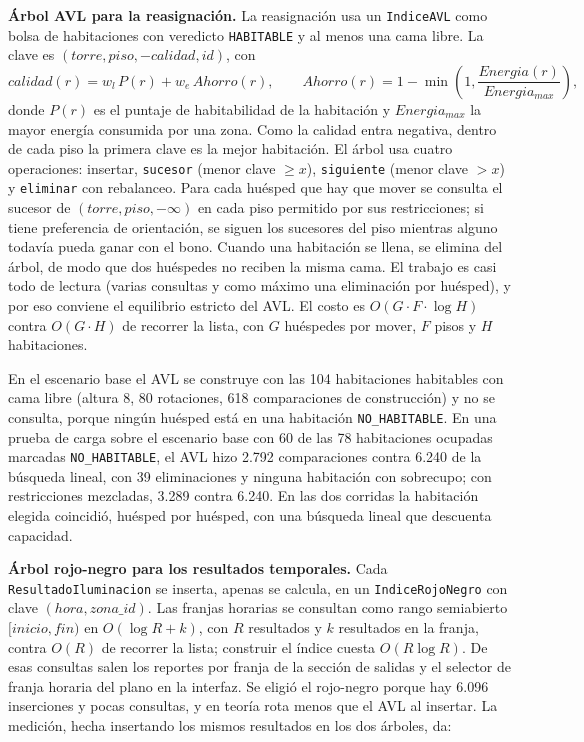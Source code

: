 \documentclass[12pt,a4paper]{article}
\newcommand{\clase}[1]{\texttt{#1}}
\newcommand{\estado}[1]{\texttt{#1}}
\newcommand{\codigo}[1]{\texttt{#1}}
\begin{document}
\textbf{Árbol AVL para la reasignación.} La reasignación usa un \clase{IndiceAVL} como bolsa de habitaciones con veredicto \estado{HABITABLE} y al menos una cama libre. La clave es $(torre, piso, -calidad, id)$, con
\begin{equation}
 calidad(r)=w_l\,P(r)+w_e\,Ahorro(r),\qquad Ahorro(r)=1-\min\left(1,\frac{Energia(r)}{Energia_{max}}\right),
 \label{eq:calidad}
\end{equation}
donde $P(r)$ es el puntaje de habitabilidad de la habitación y $Energia_{max}$ la mayor energía consumida por una zona. Como la calidad entra negativa, dentro de cada piso la primera clave es la mejor habitación. El árbol usa cuatro operaciones: insertar, \codigo{sucesor} (menor clave $\geq x$), \codigo{siguiente} (menor clave $>x$) y \codigo{eliminar} con rebalanceo. Para cada huésped que hay que mover se consulta el sucesor de $(torre, piso, -\infty)$ en cada piso permitido por sus restricciones; si tiene preferencia de orientación, se siguen los sucesores del piso mientras alguno todavía pueda ganar con el bono. Cuando una habitación se llena, se elimina del árbol, de modo que dos huéspedes no reciben la misma cama. El trabajo es casi todo de lectura (varias consultas y como máximo una eliminación por huésped), y por eso conviene el equilibrio estricto del AVL. El costo es $O(G\cdot F\cdot\log H)$ contra $O(G\cdot H)$ de recorrer la lista, con $G$ huéspedes por mover, $F$ pisos y $H$ habitaciones.

En el escenario base el AVL se construye con las 104 habitaciones habitables con cama libre (altura 8, 80 rotaciones, 618 comparaciones de construcción) y no se consulta, porque ningún huésped está en una habitación \estado{NO\_HABITABLE}. En una prueba de carga sobre el escenario base con 60 de las 78 habitaciones ocupadas marcadas \estado{NO\_HABITABLE}, el AVL hizo 2.792 comparaciones contra 6.240 de la búsqueda lineal, con 39 eliminaciones y ninguna habitación con sobrecupo; con restricciones mezcladas, 3.289 contra 6.240. En las dos corridas la habitación elegida coincidió, huésped por huésped, con una búsqueda lineal que descuenta capacidad.

\textbf{Árbol rojo-negro para los resultados temporales.} Cada \clase{ResultadoIluminacion} se inserta, apenas se calcula, en un \clase{IndiceRojoNegro} con clave $(hora, zona\_id)$. Las franjas horarias se consultan como rango semiabierto $[inicio, fin)$ en $O(\log R+k)$, con $R$ resultados y $k$ resultados en la franja, contra $O(R)$ de recorrer la lista; construir el índice cuesta $O(R\log R)$. De esas consultas salen los reportes por franja de la sección de salidas y el selector de franja horaria del plano en la interfaz. Se eligió el rojo-negro porque hay 6.096 inserciones y pocas consultas, y en teoría rota menos que el AVL al insertar. La medición, hecha insertando los mismos resultados en los dos árboles, da:
\end{document}
